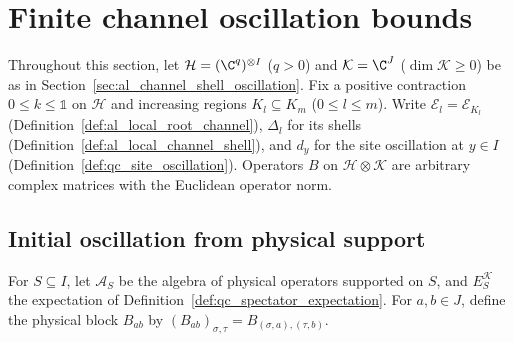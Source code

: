 
\section{Finite channel oscillation bounds}
\label{sec:al_channel_propagation}

Throughout this section, let $\mathcal H=(\C^q)^{\otimes I}$ ($q>0$) and
$\mathcal K=\C^J$ ($\dim\mathcal K\ge0$) be as in
Section~\ref{sec:al_channel_shell_oscillation}. Fix a positive contraction
$0\le k\le\mathbb 1$ on $\mathcal H$ and increasing regions
$K_l\subseteq K_m$ ($0\le l\le m$). Write
$\mathcal E_l=\mathcal E_{K_l}$ (Definition~\ref{def:al_local_root_channel}),
$\Delta_l$ for its shells (Definition~\ref{def:al_local_channel_shell}), and
$d_y$ for the site oscillation at $y\in I$
(Definition~\ref{def:qc_site_oscillation}). Operators $B$ on
$\mathcal H\otimes\mathcal K$ are arbitrary complex matrices with the
Euclidean operator norm.

\subsection{Initial oscillation from physical support}

For $S\subseteq I$, let $\mathcal A_S$ be the algebra of physical operators
supported on $S$, and $E_S^{\mathcal K}$ the expectation of
Definition~\ref{def:qc_spectator_expectation}. For $a,b\in J$, define the
physical block $B_{ab}$ by $(B_{ab})_{\sigma,\tau}=B_{(\sigma,a),(\tau,b)}$.


